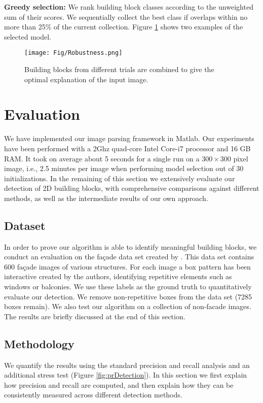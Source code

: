 \documentclass{acmtog}
\begin{document}
\textbf{Greedy selection:} We rank building block classes according to the unweighted sum of their scores. We sequentially collect the best class if overlaps within no more than 25\% of the current collection. Figure \ref{fig:Rob} shows two examples of the selected model.


\begin{figure}[t!]
  \centering
  \texttt{[image: Fig/Robustness.png]}
  \caption{Building blocks from different trials are combined to give the optimal explanation of the input image.} \label{fig:Rob}
\end{figure}

\section{Evaluation}
\label{sec:Evaluation}

We have implemented our image parsing framework in Matlab. Our experiments have been performed with a 2Ghz quad-core Intel Core-i7 processor and 16 GB RAM. It took on average about 5 seconds for a single run on a $300 \times 300$ pixel image, i.e., 2.5 minutes per image when performing model selection out of 30 initializations. In the remaining of this section we extensively evaluate our detection of 2D building blocks, with comprehensive comparisons against different methods, as well as the intermediate results of our own approach.

\subsection{Dataset}
In order to prove our algorithm is able to identify meaningful building blocks, we conduct an evaluation on the fa{\c{c}}ade data set created by \cite{ZHANGsig13}. This data set contains 600 fa{\c{c}}ade images of various structures. For each image a box pattern has been interactive created by the authors, identifying repetitive elements such as windows or balconies. We use these labels as the ground truth to quantitatively evaluate our detection. We remove non-repetitive boxes from the data set (7285 boxes remain). We also test our algorithm on a collection of non-facade images. The results are briefly discussed at the end of this section.

\subsection{Methodology}
We quantify the results using the standard precision and recall analysis and an additional stress test (Figure \ref{fig:prDetection}). In this section we first explain how precision and recall are computed, and then explain how they can be consistently measured across different detection methods. 
\end{document}
